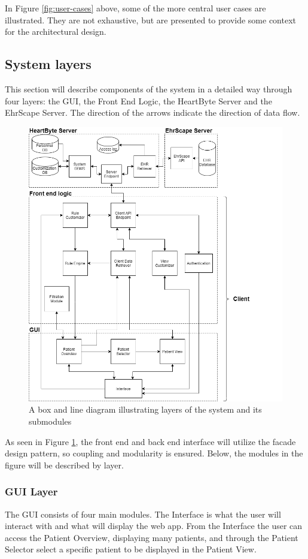 \documentclass{article}
\begin{document}
In Figure \ref{fig:user-cases} above, some of the more central user cases are illustrated. They are not exhaustive, but are presented to provide some context for the architectural design.

\subsection{System layers}
This section will describe components of the system in a detailed way through four layers: the GUI, the Front End Logic, the HeartByte Server and the EhrScape Server. The direction of the arrows indicate the direction of data flow.

\begin{figure}[h]
    \centering
    \includegraphics[scale = 0.45]{box-and-line}
    \caption{A box and line diagram illustrating layers of the system and its submodules}
    \label{fig:execution-view}
\end{figure}

As seen in Figure \ref{fig:execution-view}, the front end and back end interface will utilize the facade design pattern, so coupling and modularity is ensured. Below, the modules in the figure will be described by layer.

\subsubsection{GUI Layer}
The GUI consists of four main modules. The Interface is what the user will interact with and what will display the web app. From the Interface the user can access the Patient Overview, displaying many patients, and through the Patient Selector select a specific patient to be displayed in the Patient View. 
\end{document}
